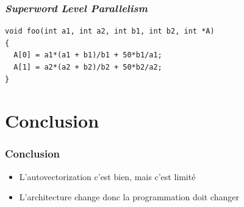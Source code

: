 \documentclass{beamer}
\begin{document}
\begin{frame}[fragile]
\frametitle{\textit{Superword Level Parallelism}}
\begin{lstlisting}
void foo(int a1, int a2, int b1, int b2, int *A) 
{
  A[0] = a1*(a1 + b1)/b1 + 50*b1/a1;
  A[1] = a2*(a2 + b2)/b2 + 50*b2/a2;
}
\end{lstlisting}
\end{frame}

\section{Conclusion}
\begin{frame}
\frametitle{Conclusion}
\begin{itemize}
\item L'autovectorization c'est bien, mais c'est limité
\item L'architecture change donc la programmation doit changer
\end{itemize}
\end{frame}
\end{document}
